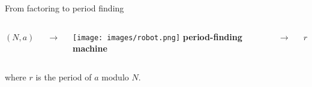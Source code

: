\documentclass{beamer}
\begin{document}
    \begin{frame}{From factoring to period finding}
        \begin{columns}[t, onlytextwidth]
            \centering
            \Huge $(N, a)$

            \centering
            \Huge $\rightarrow$

            \centering
            \texttt{[image: images/robot.png]}
            \vfill
            \footnotesize \textbf{period-finding machine}

            \centering
            \Huge $\rightarrow$

            \centering
            \Huge $r$ 
        \end{columns}
        \vspace{1.5cm}
        where $r$ is the period of $a$ modulo $N$.
    \end{frame}
\end{document}
